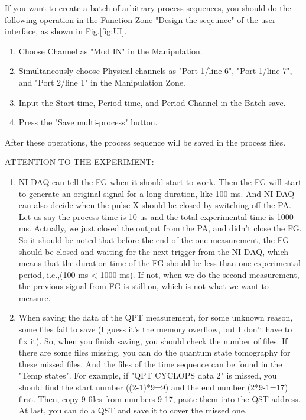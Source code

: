 \documentclass{article}
\begin{document}
If you want to create a batch of arbitrary process sequences, you should do the following operation in the Function Zone "Design the seqeunce" of the user interface, as shown in Fig.\ref{fig:UI}.
\begin{enumerate}
    \item Choose Channel as "Mod IN" in the Manipulation.
    \item Simultaneously choose Physical channels as "Port 1/line 6", "Port 1/line 7", and "Port 2/line 1" in the Manipulation Zone.
    \item Input the Start time, Period time, and Period Channel in the Batch save.
    \item Press the "Save multi-process" button.
\end{enumerate}
After these operations, the process sequence will be saved in the process files. 

\MakeUppercase{Attention to the experiment}:
\begin{enumerate}
    \item NI DAQ can tell the FG when it should start to work. Then the FG will start to generate an original signal for a long duration, like 100 ms. And NI DAQ can also decide when the pulse X should be closed by switching off the PA. Let us say the process time is 10 us and the total experimental time is 1000 ms. Actually, we just closed the output from the PA, and didn't close the FG. So it should be noted that before the end of the one measurement, the FG should be closed and waiting for the next trigger from the NI DAQ, which means that the duration time of the FG should be less than one experimental period, i.e.,(100 ms < 1000 ms). If not, when we do the second measurement, the previous signal from FG is still on, which is not what we want to measure.
    \item When saving the data of the QPT measurement, for some unknown reason, some files fail to save (I guess it's the memory overflow, but I don't have to fix it). So, when you finish saving, you should check the number of files. If there are some files missing, you can do the quantum state tomography for these missed files. And the files of the time sequence can be found in the "Temp states". For example, if "QPT CYCLOPS data 2" is missed, you should find the start number ((2-1)*9=9) and the end number (2*9-1=17) first. Then, copy 9 files from numbers 9-17, paste them into the QST address. At last, you can do a QST and save it to cover the missed one. 
\end{enumerate}
\end{document}

